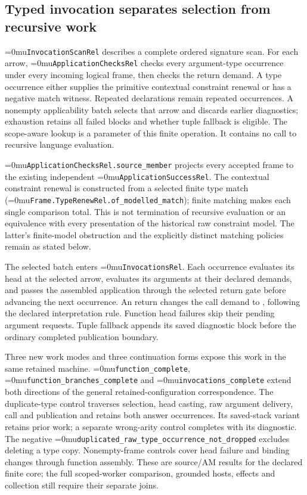 \documentclass[11pt,a4paper]{article}
\newcommand{\code}[1]{\texttt{\detokenize{#1}}}
\newcommand{\name}[1]{\textup{\Urlmuskip=0mu\relax\nolinkurl{#1}}}
\begin{document}
\subsection*{Typed invocation separates selection from recursive work}

\name{InvocationScanRel} describes a complete ordered signature scan. For
each arrow, \name{ApplicationChecksRel} checks every argument-type occurrence
under every incoming logical frame, then checks the return demand. A type
occurrence either supplies the primitive contextual constraint renewal or
has a negative match witness. Repeated declarations remain repeated
occurrences. A nonempty applicability batch selects that arrow and discards
earlier diagnostics; exhaustion retains all failed blocks and whether tuple
fallback is eligible. The scope-aware lookup is a parameter of this finite
operation. It contains no call to recursive language evaluation.

\name{ApplicationChecksRel.source_member} projects every accepted frame to
the existing independent \name{ApplicationSuccessRel}. The contextual
constraint renewal is constructed from a selected finite type match
(\name{Frame.TypeRenewRel.of_modelled_match}); finite matching makes each
single comparison total. This is not termination of recursive evaluation or
an equivalence with every presentation of the historical raw constraint
model. The latter's finite-model obstruction and the explicitly distinct
matching policies remain as stated below.

The selected batch enters \name{InvocationsRel}. Each occurrence evaluates
its head at the selected arrow, evaluates its arguments at their declared
demands, and passes the assembled application through the selected return
gate before advancing the next occurrence. An \code{Expression} return
changes the call demand to \code{\%Undefined\%}, following the declared
interpretation rule. Function head failures skip their pending argument
requests. Tuple fallback appends its saved diagnostic block before the
ordinary completed publication boundary.

Three new work modes and three continuation forms expose this work in the
same retained machine. \name{function_complete},
\name{function_branches_complete} and \name{invocations_complete} extend
both directions of the general retained-configuration correspondence.
The duplicate-type control traverses selection, head casting, raw argument
delivery, call and publication and retains both answer occurrences. Its
saved-stack variant retains prior work; a separate wrong-arity control
completes with its diagnostic. The negative
\name{duplicated_raw_type_occurrence_not_dropped} excludes deleting a type
copy. Nonempty-frame controls cover head failure and binding changes through
function assembly. These are source/AM results for the declared finite core;
the full scoped-worker comparison, grounded hosts, effects and collection
still require their separate joins.
\end{document}
